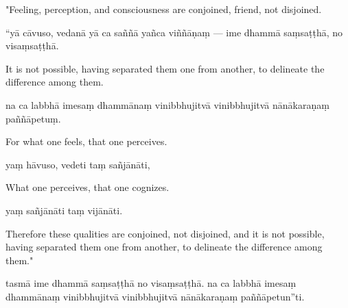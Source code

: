 \begin{samepage}
\begin{leftcolumn*}
"Feeling, perception, and consciousness are conjoined, friend, not disjoined.
\end{leftcolumn*}

\begin{rightcolumn}
“yā cāvuso, vedanā yā ca saññā yañca viññāṇaṃ — ime dhammā saṃsaṭṭhā, no visaṃsaṭṭhā.
\end{rightcolumn}
\end{samepage}

\begin{samepage}
\begin{leftcolumn*}
It is not possible, having separated them one from another, to delineate the difference among them.
\end{leftcolumn*}

\begin{rightcolumn}
na ca labbhā imesaṃ dhammānaṃ vinibbhujitvā vinibbhujitvā nānākaraṇaṃ paññāpetuṃ.
\end{rightcolumn}
\end{samepage}

\begin{samepage}
\begin{leftcolumn*}
For what one feels, that one perceives.
\end{leftcolumn*}

\begin{rightcolumn}
yaṃ hāvuso, vedeti taṃ sañjānāti,
\end{rightcolumn}
\end{samepage}

\begin{samepage}
\begin{leftcolumn*}
What one perceives, that one cognizes.
\end{leftcolumn*}

\begin{rightcolumn}
yaṃ sañjānāti taṃ vijānāti.
\end{rightcolumn}
\end{samepage}

\begin{samepage}
\begin{leftcolumn*}
Therefore these qualities are conjoined, not disjoined, and it is not possible, having separated them one from another, to delineate the difference among them."
\end{leftcolumn*}

\begin{rightcolumn}
tasmā ime dhammā saṃsaṭṭhā no visaṃsaṭṭhā. na ca labbhā imesaṃ dhammānaṃ vinibbhujitvā vinibbhujitvā nānākaraṇaṃ paññāpetun”ti.
\end{rightcolumn}
\end{samepage}

